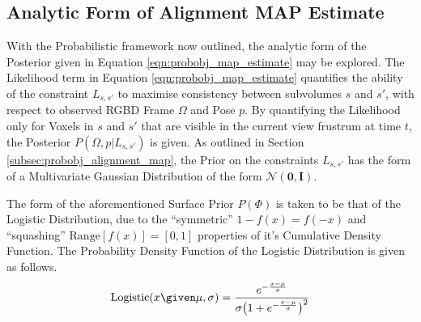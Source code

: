 \subsection{Analytic Form of Alignment MAP Estimate}
\label{subsec:probobj_analytic_alignment_map}
With the Probabilistic framework now outlined, the analytic form of the
Posterior given in Equation \ref{eqn:probobj_map_estimate} may be explored. The
Likelihood term in Equation \ref{eqn:probobj_map_estimate} quantifies the
ability of the constraint $L_{s, s'}$ to maximise consistency between subvolumes
$s$ and $s'$, with respect to observed RGBD Frame $\Omega$ and Pose $p$. By
quantifying the Likelihood only for Voxels in $s$ and $s'$ that are visible in
the current view frustrum at time $t$, the Posterior $P(\Omega, p | L_{s, s'})$
is given. As outlined in Section \ref{subsec:probobj_alignment_map}, the Prior
on the constraints $L_{s, s'}$ has the form of a Multivariate Gaussian
Distribution of the form $\mathcal{N}(\mathbf{0}, \mathbf{I})$.

The form of the aforementioned Surface Prior $P(\Phi)$ is taken to be that of
the Logistic Distribution, due to the ``symmetric'' $1 - f(x) = f(-x)$
and ``squashing'' $\text{Range}[f(x)] = [0, 1]$ properties of it's Cumulative
Density Function. The Probability Density Function of the Logistic Distribution
is given as follows.
\begin{equation}
  \label{eqn:probobj_logistic_dist}
  \text{Logistic}(x \given \mu, \sigma) = \frac
  {e^{-\frac{x - \mu}{\sigma}}}
  {\sigma \big( 1 + e^{-\frac{x - \mu}{\sigma}} \big)^{2}}
\end{equation}

